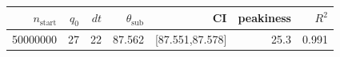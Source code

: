 \begin{tabular}{r r r r r r r}
\hline
$n_{\mathrm{start}}$ & $q_0$ & $dt$ & $\theta_{\mathrm{sub}}$ & CI & peakiness & $R^2$ \\
\hline
50000000 & 27 & 22 & 87.562 & [87.551,87.578] & 25.3 & 0.991 \\
\hline
\end{tabular}

